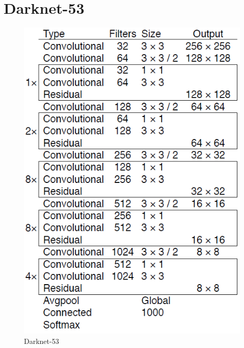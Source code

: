 \documentclass[twoside]{ctuthesis}
\theoremstyle{plain}
\theoremstyle{definition}
\theoremstyle{note}
\begin{document}
\chapter{Darknet-53}
\label{darknet-53}
\begin{figure}[H]
\caption{Darknet-53}
\includegraphics[width=.8\textwidth]{images/used_networks/yolov3_darknet.png}
\end{figure}
\end{document}
